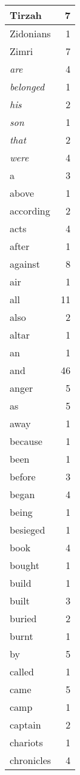 \begin{center}
\begin{longtable}{l|r}
Tirzah & 7\\ \hline 
Zidonians & 1\\ \hline 
Zimri & 7\\ \hline 
\emph{are} & 4\\ \hline 
\emph{belonged} & 1\\ \hline 
\emph{his} & 2\\ \hline 
\emph{son} & 1\\ \hline 
\emph{that} & 2\\ \hline 
\emph{were} & 4\\ \hline 
a & 3\\ \hline 
above & 1\\ \hline 
according & 2\\ \hline 
acts & 4\\ \hline 
after & 1\\ \hline 
against & 8\\ \hline 
air & 1\\ \hline 
all & 11\\ \hline 
also & 2\\ \hline 
altar & 1\\ \hline 
an & 1\\ \hline 
and & 46\\ \hline 
anger & 5\\ \hline 
as & 5\\ \hline 
away & 1\\ \hline 
because & 1\\ \hline 
been & 1\\ \hline 
before & 3\\ \hline 
began & 4\\ \hline 
being & 1\\ \hline 
besieged & 1\\ \hline 
book & 4\\ \hline 
bought & 1\\ \hline 
build & 1\\ \hline 
built & 3\\ \hline 
buried & 2\\ \hline 
burnt & 1\\ \hline 
by & 5\\ \hline 
called & 1\\ \hline 
came & 5\\ \hline 
camp & 1\\ \hline 
captain & 2\\ \hline 
chariots & 1\\ \hline 
chronicles & 4\\ \hline 

\end{longtable}
\end{center}
